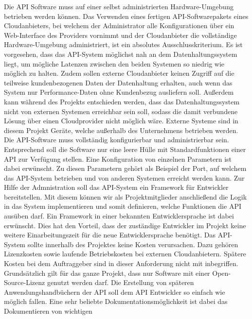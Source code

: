 \begin{outline}
  \1 Die API Software muss auf einer selbst administrierten
  Hardware\hyp{}Umgebung betrieben werden können. Das Verwenden eines fertigen
  API\hyp{}Softwarepakets eines Cloudanbieters, bei welchem der Administrator
  alle Konfigurationen über ein Web\hyp{}Interface des Providers vornimmt und
  der Cloudanbieter die vollständige Hardware\hyp{}Umgebung administriert, ist
  ein absolutes Ausschlusskriterium. Es ist vorgesehen, dass das
  API\hyp{}System möglichst nah an dem Datenhaltungssystem liegt, um mögliche
  Latenzen zwischen den beiden Systemen so niedrig wie möglich zu halten. Zudem
  sollen externe Cloudanbieter keinen Zugriff auf die teilweise kundenbezogenen
  Daten der Datenhaltung erhalten, auch wenn das System nur
  Performance\hyp{}Daten ohne Kundenbezug ausliefern soll. Außerdem kann
  während des Projekts entschieden werden, dass das Datenhaltungssystem nicht
  von externen Systemen erreichbar sein soll, sodass die damit verbundene
  Lösung über einen Cloudprovider nicht möglich wäre. Externe Systeme sind in
  diesem Projekt Geräte, welche außerhalb des Unternehmens betrieben werden.
  \1 Die API\hyp{}Software muss vollständig konfigurierbar und administrierbar
  sein.  Entsprechend soll die Software nur eine leere Hülle mit
  Standardfunktionen einer API zur Verfügung stellen. Eine Konfiguration von
  einzelnen Parametern ist dabei erwünscht. Zu diesen Parametern gehört als
  Beispiel der Port, auf welchem das API\hyp{}System betrieben und von anderen
  Systemen erreicht werden kann. Zur Hilfe der Admnistration soll das
  API\hyp{}System ein Framework für Entwickler bereitstellen. Mit diesem können
  wir als Projektmitglieder anschließend die Logik in das System implementieren
  und somit definieren, welche Funktionen die API ausüben darf. Ein Framework
  in einer bekannten Entwicklersprache ist dabei erwünscht. Dies hat den
  Vorteil, dass der zuständige Entwickler im Projekt keine weitere
  Einarbeitungszeit für die neue Entwicklersprache benötigt.
  \1 Das API\hyp{}System sollte innerhalb des Projektes keine Kosten
  verursachen.  Dazu gehören Lizenzkosten sowie laufende Betriebskosten bei
  externen Cloudanbietern. Spätere Kosten bei dem Auftraggeber sind in dieser
  Anforderung nicht mit inbegriffen. Grundsätzlich gilt für das ganze Projekt,
  dass nur Software mit einer Open\hyp{}Source\hyp{}Lizenz genutzt werden darf.
  \1 Die Erstellung von späteren Anwendungshandbüchern der API soll dem API
  Entwickler so einfach wie möglich fallen. Eine sehr beliebte
  Dokumentationsmöglichkeit ist dabei das Dokumentieren von wichtigen

\end{outline}
